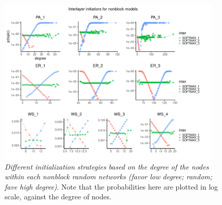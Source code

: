 \begin{figure}[H]
    \centering
    \includegraphics[width=0.95\textwidth,center]{../figures/report/FigS1.pdf}
    \caption{\label{supp:1}
    \textit{Different initialization strategies based on the degree of the nodes within each nonblock random networks (favor low degree; random; fave high degree)}. Note that the probabilities here are plotted in log scale, against the degree of nodes.
    }
\end{figure}